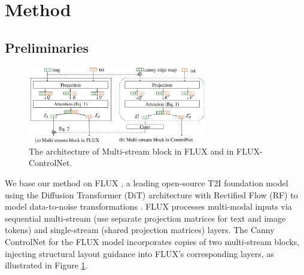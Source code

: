\documentclass{article}
\begin{document}
\section{Method}
\subsection{Preliminaries}


\begin{figure}
  \vspace{-12pt} %
    \includegraphics[width=1\linewidth,height=3.35cm]{figures/FLUX-double-controlnet.pdf}
    \caption{The architecture of Multi-stream block in FLUX and in FLUX-ControlNet.}
    \label{fig:FLUX_controlnet}
      \vspace{-5pt} %
\end{figure}

We base our method on FLUX \citep{blackforest2024FLUX}, a leading open-source T2I foundation model using the Diffusion Transformer (DiT) architecture  \citep{peebles2023scalable}  with Rectified Flow (RF) to model data-to-noise transformations \citep{liu2022flow}. FLUX processes multi-modal inputs via sequential multi-stream (use separate projection matrices for text and image tokens) and single-stream (shared projection matrices) layers. The Canny ControlNet \citep{xlabsai2025fluxcontrolnet} for the FLUX model incorporates copies of two multi-stream blocks, injecting structural layout guidance into FLUX's corresponding layers, as illustrated in Figure \ref{fig:FLUX_controlnet}.

\end{document}
